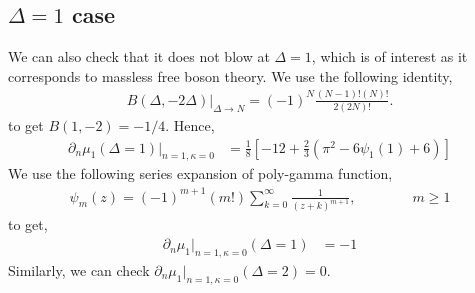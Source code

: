 \documentclass[11pt]{article}
\newcommand{\p}{\partial}
\newcommand{\lb}{\left(}
\newcommand{\rb}{\right)}
\begin{document}
\subsection{\texorpdfstring{$\Delta = 1$ case} {Delta = 1 case}}
We can also check that it does not blow at $\Delta = 1$, which is of interest as it corresponds to massless free boson theory. 
We use the following identity,
\begin{align}
    B(\Delta, -2\Delta)\Big|_{\Delta \to N} = (-1)^N \frac{(N-1)! (N)!}{2(2N)!}.
\end{align}
to get $B(1,-2) = -1/4$. Hence,
\begin{align}
    \p_n \mu_1 (\Delta = 1) \big|_{n=1, \kappa = 0} &= \frac{1}{8} \left[ -12 + \frac{2}{3}\lb \pi^2 -6\psi_1(1) + 6 \rb \right] 
\end{align}
We use the following series expansion of poly-gamma function,
\begin{align}
    \psi_m(z) = (-1)^{m+1} (m!) \sum_{k=0}^\infty \frac{1}{(z+k)^{m+1}}, \qquad \qquad m\geq 1
\end{align}
to get, 
\begin{align}
    \p_n \mu_1  \big|_{n=1, \kappa = 0} (\Delta = 1)&= -1
\end{align}
Similarly, we can check $\p_n \mu_1 \big|_{n=1, \kappa = 0}(\Delta = 2)  = 0$. 




\end{document}
